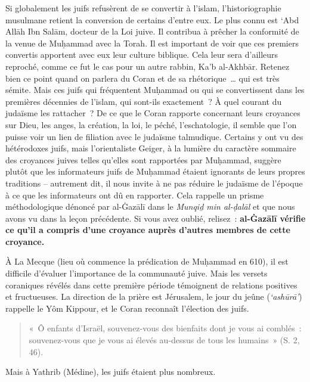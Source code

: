 Si globalement les juifs  refusèrent de se convertir à l'islam,
l'historiographie musulmane retient la conversion de certains d'entre
eux. Le plus connu est `Abd Allāh Ibn Salām, docteur de la Loi juive. Il
contribua à prêcher la conformité de la venue de Muḥammad avec la Torah.
Il est important de voir que ces premiers convertis apportent avec eux
leur culture biblique. Cela leur sera d'ailleurs reproché, comme ce fut
le cas pour un autre rabbin, Ka'b al-Akhbār. Retenez bien ce point quand
on parlera du Coran et de sa rhétorique~\ldots{} qui est très sémite.
Mais ces juifs qui fréquentent Muḥammad ou qui se convertissent dans les
premières décennies de l'islam, qui sont-ils exactement~? À quel courant
du judaïsme les rattacher~? De ce que le Coran rapporte concernant leurs
croyances sur Dieu, les anges, la création, la loi, le péché,
l'eschatologie, il semble que l'on puisse voir un lien de filiation avec
le judaïsme talmudique. Certains y ont vu des hétérodoxes juifs, mais
l'orientaliste Geiger, à la lumière du
caractère sommaire des croyances juives telles qu'elles sont rapportées
par Muḥammad, suggère plutôt que les informateurs juifs de Muḥammad
étaient ignorants de leurs propres traditions -- autrement dit, il nous
invite à ne pas réduire le judaïsme de l'époque à ce que les
informateurs ont dû en rapporter. Cela rappelle un prisme méthodologique
dénoncé par al-Ġazālī \label{theol:AlGazali24} dans le \emph{Munqiḏ min al-ḍalāl} et que nous
avons vu dans la leçon précédente. Si vous avez oublié, relisez~:
\textbf{al-Ġazālī vérifie ce qu'il a compris d'une croyance auprès
d'autres membres de cette croyance.}

À La Mecque (lieu où commence la prédication de Muḥammad en 610), il est
difficile d'évaluer l'importance de la communauté juive. Mais les
versets coraniques révélés dans cette première période témoignent de
relations positives et fructueuses. La direction de la prière est
Jérusalem, le jour du jeûne (\emph{`ashūrā'}) rappelle le Yôm Kippour,
et le Coran reconnaît l'élection des juifs.
\begin{quote}
    «~Ô enfants d'Israël, souvenez-vous des bienfaits dont je vous ai
comblés~: souvenez-vous que je vous ai élevés au-dessus de tous les
humains~» (S. 2, 46).
\end{quote}


Mais à Yathrib (Médine), les juifs étaient plus nombreux.

